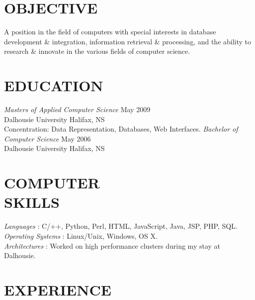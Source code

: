 \documentclass[line,margin]{res}
\begin{document}
\address{3139 Veith Street, Halifax, NS B3K 3G9}
\address{(902) 489-2557 or (902) 444-4974}


\begin{resume}

\section{OBJECTIVE}
    A position in the field of computers with special
    interests in database development {\&} integration,
    information retrieval {\&} processing, and the ability to
    research {\&} innovate in the various fields of computer
    science.


\section{EDUCATION}
    {\sl Masters of Applied Computer Science} \hfill May 2009\\
        Dalhousie University \hfill Halifax, NS\\
        Concentration: Data Representation, Databases,
        Web Interfaces.  \medskip
    \newline
    {\sl Bachelor of Computer Science} \hfill May 2006\\
        Dalhousie University \hfill Halifax, NS


\section{COMPUTER \\ SKILLS}
    {\sl Languages \hspace{35pt}}:
     C/++, Python, Perl, HTML, JavaScript, Java, JSP, PHP, SQL.\\
    {\sl Operating Systems }:
     Linux/Unix, Windows, OS X. \\
    {\sl Architectures \hspace{27pt}}:
     Worked on high performance clusters during my stay at \\
     \hspace*{92pt} Dalhousie.


\section{EXPERIENCE}


\end{resume}
\end{document}
